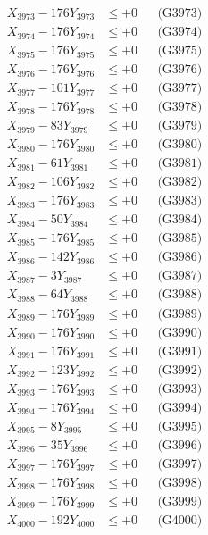 \documentclass[a4paper,10pt]{article}
\begin{document}
{\begin{align}
X_{3973} - 176Y_{3973} &\leq +0 && \text{(G3973)} \\
X_{3974} - 176Y_{3974} &\leq +0 && \text{(G3974)} \\
X_{3975} - 176Y_{3975} &\leq +0 && \text{(G3975)} \\
X_{3976} - 176Y_{3976} &\leq +0 && \text{(G3976)} \\
X_{3977} - 101Y_{3977} &\leq +0 && \text{(G3977)} \\
X_{3978} - 176Y_{3978} &\leq +0 && \text{(G3978)} \\
X_{3979} - 83Y_{3979} &\leq +0 && \text{(G3979)} \\
X_{3980} - 176Y_{3980} &\leq +0 && \text{(G3980)} \\
\allowbreak
X_{3981} - 61Y_{3981} &\leq +0 && \text{(G3981)} \\
X_{3982} - 106Y_{3982} &\leq +0 && \text{(G3982)} \\
X_{3983} - 176Y_{3983} &\leq +0 && \text{(G3983)} \\
X_{3984} - 50Y_{3984} &\leq +0 && \text{(G3984)} \\
X_{3985} - 176Y_{3985} &\leq +0 && \text{(G3985)} \\
X_{3986} - 142Y_{3986} &\leq +0 && \text{(G3986)} \\
X_{3987} - 3Y_{3987} &\leq +0 && \text{(G3987)} \\
X_{3988} - 64Y_{3988} &\leq +0 && \text{(G3988)} \\
X_{3989} - 176Y_{3989} &\leq +0 && \text{(G3989)} \\
X_{3990} - 176Y_{3990} &\leq +0 && \text{(G3990)} \\
\allowbreak
X_{3991} - 176Y_{3991} &\leq +0 && \text{(G3991)} \\
X_{3992} - 123Y_{3992} &\leq +0 && \text{(G3992)} \\
X_{3993} - 176Y_{3993} &\leq +0 && \text{(G3993)} \\
X_{3994} - 176Y_{3994} &\leq +0 && \text{(G3994)} \\
X_{3995} - 8Y_{3995} &\leq +0 && \text{(G3995)} \\
X_{3996} - 35Y_{3996} &\leq +0 && \text{(G3996)} \\
X_{3997} - 176Y_{3997} &\leq +0 && \text{(G3997)} \\
X_{3998} - 176Y_{3998} &\leq +0 && \text{(G3998)} \\
X_{3999} - 176Y_{3999} &\leq +0 && \text{(G3999)} \\
X_{4000} - 192Y_{4000} &\leq +0 && \text{(G4000)} \\

\end{align}}
\end{document}
